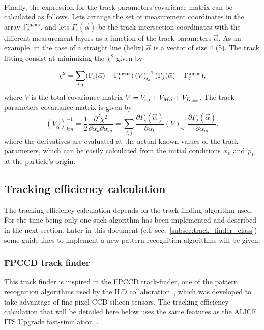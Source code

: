 ~\\
Finally, the expression for the track parameters covariance matrix can be calculated as follows. Lets arrange the set of measurement coordinates in the array $\Gamma^{\rm meas}_i$, and lets 
$\Gamma_i(\vec{\alpha})$ be the track intersection coordinates with the different measurement layers as a function of the track parameters $\vec{\alpha}$. As an example, in the case of a straight 
line (helix) $\vec{\alpha}$ is a vector of size 4 (5). The track fitting consist at minimizing the $\chi^2$ given by

\begin{equation}
  \chi^2 = \sum_{i,j} (\Gamma_i(\vec{\alpha}) - \Gamma^{\rm meas}_i) \left(V\right)^{-1}_{ij} (\Gamma_j(\vec{\alpha}) - \Gamma^{\rm meas}_j),
\end{equation}
\noindent
where $V$ is the total covariance matrix $V = V_{\rm sp} + V_{MS} + V_{E_{\rm loss}}$. The track parameters covariance matrix is given by
\begin{equation}
 \left(V_{\vec{\alpha}} \right)^{-1}_{km} = \frac{1}{2}\frac{\partial^2\chi^2}{\partial \alpha_k \partial \alpha_m} = \sum_{i,j} \frac{\partial \Gamma_i(\vec{\alpha})}{\partial \alpha_k} \left(V \right)^{-1}_{ij} \frac{\partial \Gamma_j(\vec{\alpha})}{\partial \alpha_m}.
\end{equation}
\noindent
where the derivatives are evaluated at the actual known values of the track parameters, which can be easily calculated from the initial conditions $\vec{x}_0$ and $\vec{p}_0$ at the particle's origin.

\subsection{Tracking efficiency calculation}
\label{subsec:TrkEffic_calculation}

The tracking efficiency calculation depends on the track-finding algorithm used. For the time being only one such algorithm has been implemented and described in the next section.
Later in this document (c.f. sec.~\ref{subsec:track_finder_class}) some guide lines to implement a new pattern recognition algorithms will be given.

\subsubsection{FPCCD track finder}
\label{subsubsec:FPCCDTrkEffic_calculation}

This track finder is inspired in the FPCCD track-finder, one of the pattern recognition algorithms used by the ILD collaboration~\cite{bib:ILD_FPCCD_TrackFinder}, which
was developed to take advantage of fine pixel CCD silicon sensors. The tracking efficiency calculation that will be detailed here below uses the same features as the ALICE 
ITS Upgrade fast-simulation~\cite{bib:ALICE_fastsim}.

